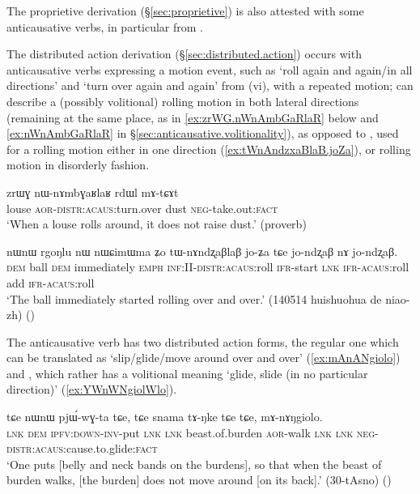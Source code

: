 The proprietive  derivation (§\ref{sec:proprietive}) is also attested with some anticausative verbs, in particular  from .

The distributed action derivation (§\ref{sec:distributed.action}) occurs with anticausative verbs expressing a motion event, such as  `roll again and again/in all directions' and  `turn over again and again'  from   (vi), with a repeated motion;  can describe a (possibly volitional) rolling motion in both lateral directions (remaining at the same place, as in \ref{ex:zrWG.nWnAmbGaRlaR} below and \ref{ex:nWnAmbGaRlaR} in §\ref{sec:anticausative.volitionality}), as opposed to , used for a rolling motion either in one direction (\ref{ex:tWnAndzxaBlaB.joZa}), or  rolling motion in disorderly fashion.

\begin{exe}
\ex \label{ex:zrWG.nWnAmbGaRlaR}
\gll  zrɯɣ nɯ-nɤmbɣaʁlaʁ rdɯl mɤ-tɕɤt \\
louse \textsc{aor}-\textsc{distr}:\textsc{acaus}:turn.over dust \textsc{neg}-take.out:\textsc{fact} \\
\glt `When a louse rolls around, it does not raise dust.' (proverb)
\end{exe}

\begin{exe}
\ex \label{ex:tWnAndzxaBlaB.joZa}
\gll nɯnɯ rgoŋlu nɯ nɯɕimɯma ʑo tɯ-nɤndʐaβlaβ jo-ʑa tɕe jo-ndʐaβ nɤ jo-ndʐaβ. \\
\textsc{dem} ball \textsc{dem} immediately \textsc{emph} \textsc{inf}:II-\textsc{distr}:\textsc{acaus}:roll \textsc{ifr}-start \textsc{lnk} \textsc{ifr}-\textsc{acaus}:roll add \textsc{ifr}-\textsc{acaus}:roll \\
\glt `The ball immediately started rolling over and over.' (140514 huishuohua de niao-zh)
()
\end{exe}


The anticausative verb  has two distributed action forms, the regular one  which can be translated as `slip/glide/move around over and over' (\ref{ex:mAnANgiolo}) and , which rather has a volitional meaning `glide, slide (in no particular direction)' (\ref{ex:YWnWNgiolWlo}).
 
\begin{exe}
\ex \label{ex:mAnANgiolo}
\gll tɕe nɯnɯ pjɯ́-wɣ-ta tɕe, tɕe snama tɤ-ŋke tɕe tɕe, mɤ-nɤŋgiolo.  \\
\textsc{lnk} \textsc{dem} \textsc{ipfv}:\textsc{down}-\textsc{inv}-put \textsc{lnk} \textsc{lnk} beast.of.burden \textsc{aor}-walk \textsc{lnk} \textsc{lnk} \textsc{neg}-\textsc{distr}:\textsc{acaus}:cause.to.glide:\textsc{fact} \\
\glt `One puts [belly and neck bands on the burdens], so that when the beast of burden walks, [the burden] does not move around [on its back].' (30-tAsno)
()
 \end{exe}
 

